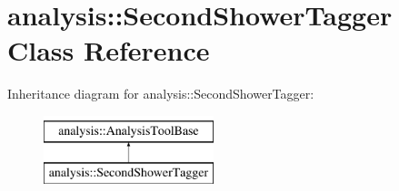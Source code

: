 \hypertarget{classanalysis_1_1SecondShowerTagger}{}\section{analysis\+:\+:Second\+Shower\+Tagger Class Reference}
\label{classanalysis_1_1SecondShowerTagger}
Inheritance diagram for analysis\+:\+:Second\+Shower\+Tagger\+:\begin{figure}[H]
\begin{center}
\leavevmode
\includegraphics[height=2.000000cm]{classanalysis_1_1SecondShowerTagger}
\end{center}
\end{figure}
